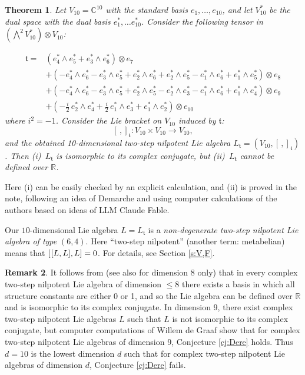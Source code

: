 \documentclass[11pt]{amsart}
\theoremstyle{plain}
\newtheorem{theorem}{Theorem}[section]
\theoremstyle{definition}
\newtheorem{remark}[theorem]{Remark}
\newcommand{\hs}{\kern 0.8pt}
\newcommand{\C}{{\mathds C}}
\newcommand{\R}{{\mathds R}}
\renewcommand{\Lambda}{\textstyle\bigwedge}
\newcommand{\tf}{{\mathfrak t}}
\begin{document}
\begin{theorem}\label{t:main}
Let $V_{10}=\C^{10}$ with the standard basis $e_1,\dots,e_{10}$\hs,
and let $V_{10}^*$ be the dual space with the dual basis $e_1^*,\dots e_{10}^*$.
Consider the following tensor in $(\Lambda^2 V_{10}^*)\otimes V_{10}$:

\begin{align*}
\tf=&(e_4^*\wedge e_5^*+e_3^*\wedge e_6^*)\otimes e_7\\
&+(-e_4^*\wedge e_6^*-e_3^*\wedge e_5^*+e_2^*\wedge e_6^*
+e_2^*\wedge e_5^*-e_1^*\wedge e_6^*+e_1^*\wedge e_5^*)\otimes e_8\\
&+(-e_4^*\wedge e_6^*-e_3^*\wedge e_5^*+e_2^*\wedge e_5^*
-e_2^*\wedge e_3^*-e_1^*\wedge e_6^*+e_1^*\wedge e_4^*)\otimes e_9\\
&+(-\tfrac{i}{2}\,e_2^*\wedge e_4^*+\tfrac{i}{2}\,e_1^*\wedge e_3^*
+e_1^*\wedge e_2^*)\otimes e_{10}
\end{align*}
where $i^2=-1$.
Consider the Lie bracket on $V_{10}$ induced by $\tf$:
\[ [\, ,]_\tf\colon V_{10}\times V_{10}\to V_{10}, \]
and  the obtained 10-dimensional two-step nilpotent Lie algebra $L_\tf=(V_{10},[\,,]_\tf)$\hs.
Then  (i)~$L_\tf$ is isomorphic to its complex conjugate, but (ii)~$L_\tf$ cannot be defined over $\R$.
\end{theorem}

Here (i) can be easily checked by an explicit calculation, and (ii) is  proved
in the note, following an idea of Demarche
and using computer calculations of the authors based on ideas of LLM Claude Fable.

Our $10$-dimensional Lie algebra $L=L_\tf$ is a {\em non-degenerate two-step nilpotent Lie algebra of type} $(6,4)$.
Here ``two-step nilpotent'' (another term: metabelian) means that $[\hs[L,L],L]=0$.
For details, see Section \ref{s:V,F}.

\begin{remark}
It follows from \cite[Tables 2 and 8]{GT} (see also \cite{BDG} for dimension 8 only)
that in every complex two-step nilpotent Lie algebra
of dimension $\le 8$ there exists a basis in which all structure constants are either 0 or 1,
and so the Lie algebra can be defined over $\R$ and is isomorphic to its complex conjugate.
In dimension 9, there exist complex two-step nilpotent Lie algebras $L$
such that $L$ is not isomorphic to its complex conjugate, but computer computations of Willem de Graaf
show that for complex two-step nilpotent Lie algebras of dimension 9,
Conjecture \ref{cj:Dere} holds.
Thus $d=10$ is the lowest dimension $d$ such that
for complex two-step nilpotent Lie algebras of dimension $d$,
Conjecture \ref{cj:Dere} fails.
\end{remark}
\end{document}
